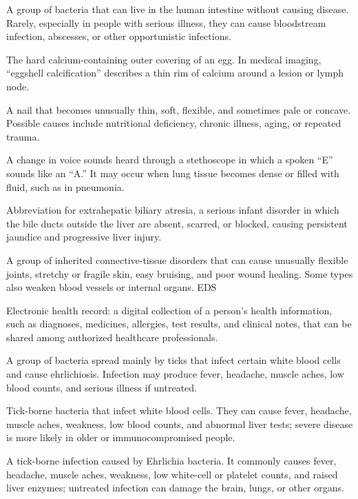  A group of bacteria that can live in the human intestine without causing disease. Rarely, especially in people with serious illness, they can cause bloodstream infection, abscesses, or other opportunistic infections.

 The hard calcium-containing outer covering of an egg. In medical imaging, “eggshell calcification” describes a thin rim of calcium around a lesion or lymph node.

 A nail that becomes unusually thin, soft, flexible, and sometimes pale or concave. Possible causes include nutritional deficiency, chronic illness, aging, or repeated trauma.

 A change in voice sounds heard through a stethoscope in which a spoken “E” sounds like an “A.” It may occur when lung tissue becomes dense or filled with fluid, such as in pneumonia.

 Abbreviation for extrahepatic biliary atresia, a serious infant disorder in which the bile ducts outside the liver are absent, scarred, or blocked, causing persistent jaundice and progressive liver injury.

 A group of inherited connective-tissue disorders that can cause unusually flexible joints, stretchy or fragile skin, easy bruising, and poor wound healing. Some types also weaken blood vessels or internal organs.
\synonyms
EDS

 Electronic health record: a digital collection of a person’s health information, such as diagnoses, medicines, allergies, test results, and clinical notes, that can be shared among authorized healthcare professionals.

 A group of bacteria spread mainly by ticks that infect certain white blood cells and cause ehrlichiosis. Infection may produce fever, headache, muscle aches, low blood counts, and serious illness if untreated.

 Tick-borne bacteria that infect white blood cells. They can cause fever, headache, muscle aches, weakness, low blood counts, and abnormal liver tests; severe disease is more likely in older or immunocompromised people.

 A tick-borne infection caused by Ehrlichia bacteria. It commonly causes fever, headache, muscle aches, weakness, low white-cell or platelet counts, and raised liver enzymes; untreated infection can damage the brain, lungs, or other organs.

